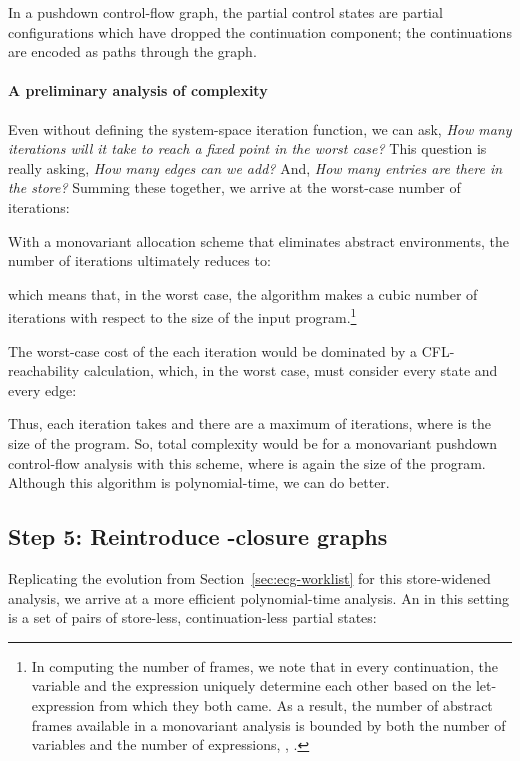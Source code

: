 In a pushdown control-flow graph, the partial control states are
partial configurations which have dropped the continuation component;
the continuations are encoded as paths through the graph.

\paragraph{A preliminary analysis of complexity}
Even without defining the system-space iteration function, we can ask,
\emph{How many iterations will it take to reach a fixed point in the worst
case?}
This question is really asking, \emph{How many edges can we add?}
And, \emph{How many entries are there in the store?}
Summing these together, we arrive at the worst-case number of
iterations:

With a monovariant allocation scheme that eliminates abstract environments, the number of iterations
ultimately reduces to:

which means that, in the worst case, the algorithm makes a cubic
number of iterations with respect to the size of the input
program.\footnote{In computing the number of frames, we note that in
  every continuation, the variable and the expression uniquely
  determine each other based on the let-expression from which they
  both came.
As a result, the number of abstract frames available in a
  monovariant analysis is bounded by both the number of variables and
  the number of expressions, \ie, .}

The worst-case cost of the each iteration would be dominated by a
CFL-reachability calculation, which, in the worst case, must consider
every state and every edge:

Thus, each iteration takes  and there are a maximum of  iterations, where  is the size of the program.
So, total complexity would be  for a monovariant
pushdown control-flow analysis with this scheme, where  is again the size of the program.
Although this algorithm is polynomial-time, we can do better.



\subsection{Step 5: Reintroduce 
  -closure graphs}\label{sec:pdcfa-eps}
Replicating the evolution from Section~\ref{sec:ecg-worklist} for this
store-widened analysis, we arrive at a more efficient polynomial-time
analysis.
An \ecg{} in this setting is a set of pairs of store-less,
continuation-less partial states:

